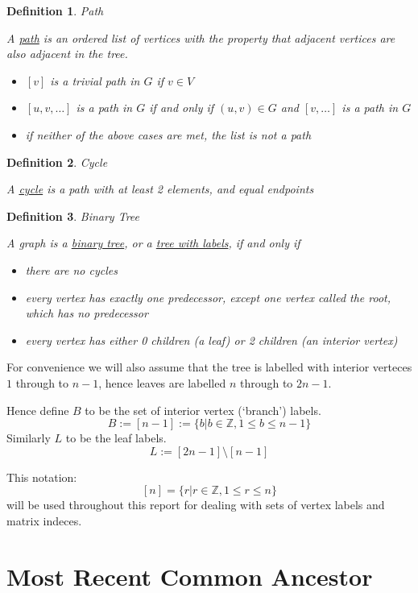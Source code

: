 \documentclass[10pt,a4paper]{report}
\newcommand{\Z}{\mathbb{Z}}
\newtheorem{definition}{Definition}
\begin{document}
\begin{definition} Path

	A \underline{path} is an ordered list of vertices with the property that
	adjacent vertices are also adjacent in the tree.

	\begin{itemize}
		\item $[v]$ is a trivial path in $G$ if $v \in V$
		\item $[u, v, \ldots]$ is a path in $G$ if and only if $(u, v) \in G$
			and $[v, \ldots]$ is a path in $G$
		\item if neither of the above cases are met, the list is not a path
	\end{itemize}
\end{definition}

\begin{definition} Cycle

	A \underline{cycle} is a path with at least 2 elements, and equal endpoints
\end{definition}

\begin{definition} Binary Tree

	A graph is a \underline{binary tree}, or a \underline{tree with labels}, if
	and only if
	\begin{itemize}
		\item there are no cycles
		\item every vertex has exactly one predecessor, except one vertex
			called the root, which has no predecessor
		\item every vertex has either 0 children (a leaf) or 2 children
			(an interior vertex)
	\end{itemize}
\end{definition}

For convenience we will also assume that the tree is labelled with interior
verteces $1$ through to $n-1$, hence leaves are labelled $n$ through to
$2n-1$.

Hence define $B$ to be the set of interior vertex (`branch') labels.
\[B := [n-1] := \{b | b \in \Z, 1 \leq b \leq n-1\}\]
Similarly $L$ to be the leaf labels.
\[L := [2n-1] \setminus [n-1]\]

This notation: \[[n] = \{r|r\in\Z, 1 \leq r \leq n\}\] will be used throughout
this report for dealing with sets of vertex labels and matrix indeces.

\section{Most Recent Common Ancestor}
\end{document}
